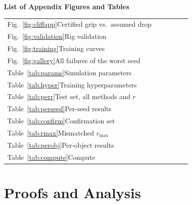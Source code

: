 \begin{minipage}[t]{0.48\textwidth}
{\large\bfseries List of Appendix Figures and Tables}\par\medskip\small
\begin{tabular}{@{}p{0.82\linewidth}r@{}}
Fig.~\ref{fig:cliffapp}\quad Certified grip vs.\ assumed drop & \pageref{fig:cliffapp}\\
Fig.~\ref{fig:validation}\quad Rig validation & \pageref{fig:validation}\\
Fig.~\ref{fig:training}\quad Training curves & \pageref{fig:training}\\
Fig.~\ref{fig:gallery}\quad All failures of the worst seed & \pageref{fig:gallery}\\
Table~\ref{tab:params}\quad Simulation parameters & \pageref{tab:params}\\
Table~\ref{tab:hyper}\quad Training hyperparameters & \pageref{tab:hyper}\\
Table~\ref{tab:perr}\quad Test set, all methods and $r$ & \pageref{tab:perr}\\
Table~\ref{tab:perseed}\quad Per-seed results & \pageref{tab:perseed}\\
Table~\ref{tab:confirm}\quad Confirmation set & \pageref{tab:confirm}\\
Table~\ref{tab:rmax}\quad Mismatched $r_{\max}$ & \pageref{tab:rmax}\\
Table~\ref{tab:perobj}\quad Per-object results & \pageref{tab:perobj}\\

Table~\ref{tab:compute}\quad Compute & \pageref{tab:compute}\\
\end{tabular}
\end{minipage}
\vspace{1.2em}

\section{Proofs and Analysis}\label{app:proof}
